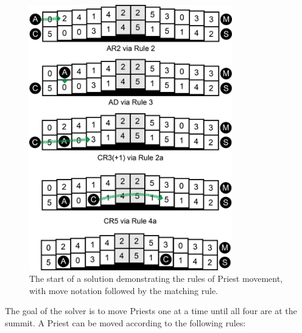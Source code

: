 \documentclass[journal]{IEEEtran}
\begin{document}
\begin{figure}[t]
\centering
\includegraphics[width=8.8cm]{priestrulesfixed.png}
\caption{The start of a solution demonstrating the rules of Priest movement, with move notation followed by the matching rule. }
\label{fig:priestrules}
\end{figure}

The goal of the solver is to move Priests one at a time until all four are at the summit. A Priest can be moved according to the following rules:  
\end{document}
